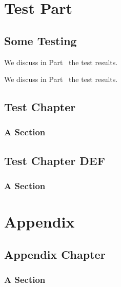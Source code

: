 \documentclass[11pt,paper=A4,footinclude,headinclude]{scrbook} %
\begin{document}

    \tableofcontents


    \cleardoublepage\part{Test Part}\label{part:testpart}
    \chapter{Some Testing}
    We discuss in Part~\ref{part:testpart} the test results.

    We discuss in Part~\textsc{\ref{part:testpart}} the test results.
    \lipsum[1]

    \chapter{Test Chapter }
    \lipsum[1]

    \section{A Section}
    \lipsum[1]

    \chapter{Test Chapter DEF}
    \lipsum[1]

    \section{A Section}
    \lipsum[1]

%   

    \appendix
    \cleardoublepage\part{Appendix}
    \chapter{Appendix Chapter}
    \lipsum[1]

    \section{A Section}
    \lipsum[1]
\end{document}
